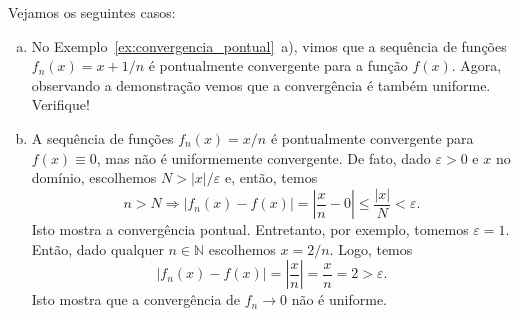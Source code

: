 \begin{ex}\label{ex:convergencia_uniforme}
  Vejamos os seguintes casos:
  \begin{enumerate}[a)] 
  \item No Exemplo~\ref{ex:convergencia_pontual}~a), vimos que a
    sequência de funções $f_n(x) = x + 1/n$ é pontualmente convergente
    para a função $f(x)$. Agora, observando a demonstração vemos que a
    convergência é também uniforme. Verifique!
  \item A sequência de funções $f_n(x) = x/n$ é pontualmente
    convergente para $f(x)\equiv 0$, mas não é uniformemente
    convergente. De fato, dado $\varepsilon>0$ e $x$ no domínio,
    escolhemos $N>|x|/\varepsilon$ e, então, temos
    \begin{equation}
      n>N \Rightarrow |f_n(x) - f(x)| = \left|\frac{x}{n}-0\right|\leq \frac{|x|}{N} < \varepsilon.
    \end{equation}
    Isto mostra a convergência pontual. Entretanto, por exemplo,
    tomemos $\varepsilon=1$. Então, dado qualquer $n\in \mathbb{N}$
    escolhemos $x=2/n$. Logo, temos
    \begin{equation}
      |f_n(x) - f(x)| = \left|\frac{x}{n}\right| = \frac{x}{n} = 2 > \varepsilon.
    \end{equation}
    Isto mostra que a convergência de $f_n\to 0$ não é uniforme.
  \end{enumerate}
\end{ex}

